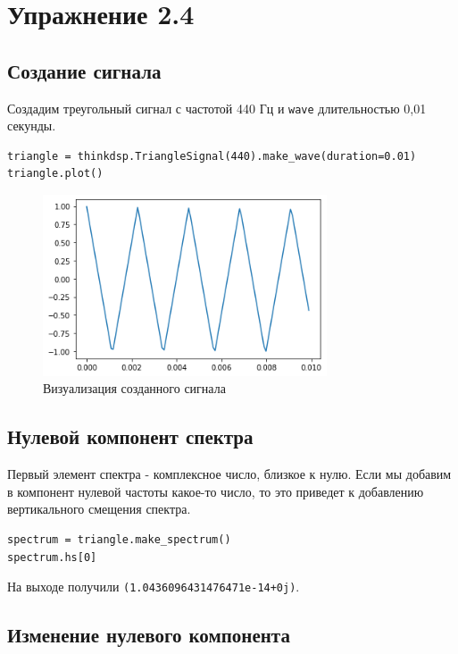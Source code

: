 \documentclass[a4paper,12pt]{report}
\begin{document}
\chapter{Упражнение 2.4}
\section{Создание сигнала}

Создадим треугольный сигнал с частотой 440 Гц и \texttt{wave} длительностью 0,01 секунды.

\begin{lstlisting}[caption=Создание треугольного сигнала]
triangle = thinkdsp.TriangleSignal(440).make_wave(duration=0.01)
triangle.plot()
\end{lstlisting}

\begin{figure}[H]
        \centering
        \includegraphics[width=0.75\textwidth]{lab2_fig4_1.png}
        \caption{Визуализация созданного сигнала}
        \label{fig:lab2_fig4_1}
\end{figure}

\section{Нулевой компонент спектра}

Первый элемент спектра - комплексное число, близкое к нулю. Если мы добавим в компонент нулевой частоты какое-то число, то это приведет к добавлению вертикального смещения спектра.

\begin{lstlisting}[caption=Вывод нулевого компонента]
spectrum = triangle.make_spectrum()
spectrum.hs[0]
\end{lstlisting}

На выходе получили \texttt{(1.0436096431476471e-14+0j)}.

\section{Изменение нулевого компонента}
\end{document}

